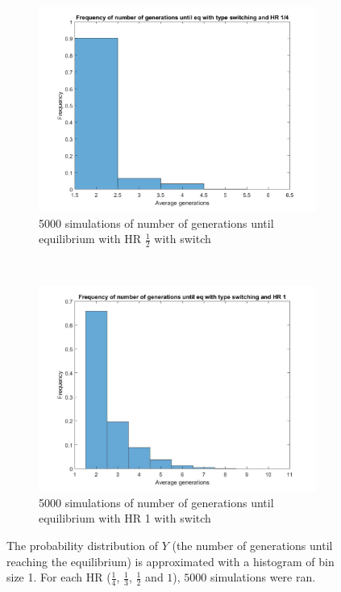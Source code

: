 \begin{figure}[H]
\begin{subfigure}{0.45\textwidth}
        \includegraphics[width=\textwidth]{AantGen3.pdf}
        \caption{5000 simulations of number of generations until equilibrium with HR $\frac{1}{2}$ with switch}
        \label{hists hap 1/2}
    \end{subfigure}
    ~
    \begin{subfigure}{0.45\textwidth}
        \includegraphics[width=\textwidth]{AantGen4.pdf}
        \caption{5000 simulations of number of generations until equilibrium with HR 1 with switch}
        \label{hists hap 1}
    \end{subfigure}
    \caption{The probability distribution of $Y$ (the number of generations until reaching the equilibrium) is approximated with a histogram of bin size 1. 
    For each HR ($\frac{1}{4}$, $\frac{1}{3}$, $\frac{1}{2}$ and $1$), $5000$ simulations were ran.}
    \label{fig:histogramSw}
\end{figure}

